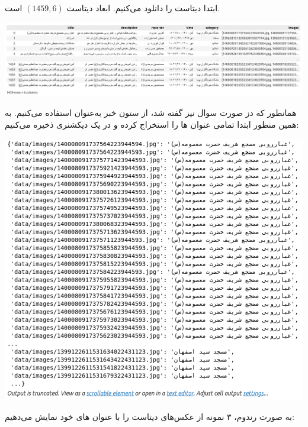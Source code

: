 \begin{qsolve}
	
ابتدا دیتاست را دانلود می‌کنیم. ابعاد دیتاست $(1459, 6)$ است.

\begin{center}
	\includegraphics*[width=1\linewidth]{pics/img20.png}
	\label{دیتاست ورودی}
\end{center}

همانطور که دز صورت سوال نیز گفته شد، از ستون  خبر به‌عنوان  استفاده می‌کنیم. به همین منظور ابتدا تمامی عنوان ها را استخراج کرده و در یک دیکشنری ذخیره می‌کنیم:

\begin{center}
	\includegraphics*[width=0.8\linewidth]{pics/img21.png}
	\label{عنوان‌های خبر}
\end{center}

به صورت رندوم، ۳ نمونه از عکس‌های دیتاست را با عنوان های خود نمایش می‌دهیم:
\end{qsolve}



